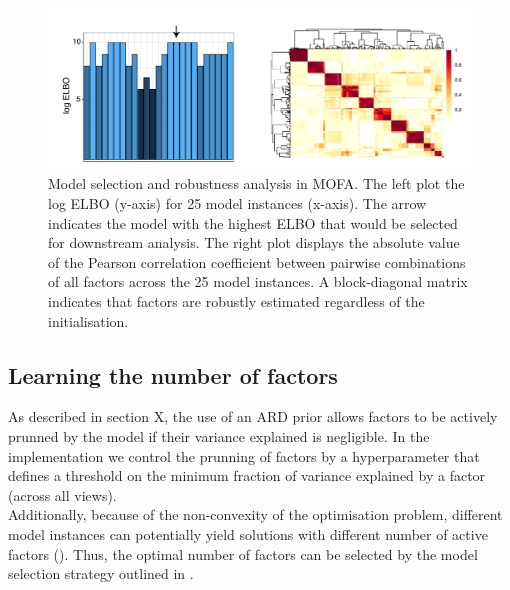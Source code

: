 \begin{figure}[H]
	\centering 	
	\includegraphics[width=1.0\textwidth]{MOFA_robustness}
	\caption{ Model selection and robustness analysis in MOFA. The left plot the log ELBO (y-axis) for 25 model instances (x-axis).
	The arrow indicates the model with the highest ELBO that would be selected for downstream analysis. The right plot displays the absolute value of the Pearson correlation coefficient between pairwise combinations of all factors across the 25 model instances. A block-diagonal matrix indicates that factors are robustly estimated regardless of the initialisation.}
	\label{fig:MOFA_robustness}
\end{figure}







\subsection{Learning the number of factors} \label{section:number_factors}
As described in section X, the use of an ARD prior allows factors to be actively prunned by the model if their variance explained is negligible. In the implementation we control the prunning of factors by a hyperparameter that defines a threshold on the minimum fraction of variance explained by a factor (across all views).\\
Additionally, because of the non-convexity of the optimisation problem, different model instances can potentially yield solutions with different number of active factors (). Thus, the optimal number of factors can be selected by the model selection strategy outlined in .

